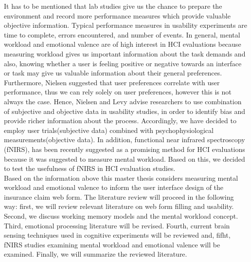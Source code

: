 \documentclass[a4paper]{report}
\begin{document}
	It has to be mentioned that lab studies give us the chance to prepare the environment and record more performance measures which provide valuable objective information. Typical performance measures in usability experiments are time to complete, errors encountered, and number of events. In general, mental workload and emotional valence are of high interest in HCI evaluations because measuring workload gives us important information about the task demands and also, knowing whether a user is feeling positive or negative towards an interface or task may give us valuable information about their general preferences. Furthermore, Nielsen\cite{nielsen1994measuring} suggested that user preferences correlate with user performance, thus we can rely solely on user preferences, however this is not always the case. Hence, Nielsen and Levy \cite{nielsen1994measuring} advise researchers to use combination of subjective and objective data in usability studies, in order to identify bias and provide richer information about the process. Accordingly, we have decided to employ user trials(subjective data) combined with psychophysiological measurements(objective data). In addition, functional near infrared spectroscopy (fNIRS), has been recently suggested as a promising method for HCI evaluations\cite{maior2015examining,pike2014measuring} because it was suggested to measure mental workload\cite{maior2014continuous}. Based on this, we decided to test the usefulness of fNIRS in HCI evaluation studies. \\
	
	Based on the information above this master thesis considers measuring mental workload and emotional valence to inform the user interface design of the insurance claim web form. The literature review will proceed in the following way: first, we will review relevant literature on web form filling and usability. Second, we discuss working memory models and the mental workload concept. Third, emotional processing literature will be revised. Fourth, current brain sensing techniques used in cognitive experiments will be reviewed and, fifht, fNIRS studies examining mental workload and emotional valence will be examined. Finally, we will summarize the reviewed literature. 
	
\end{document}
